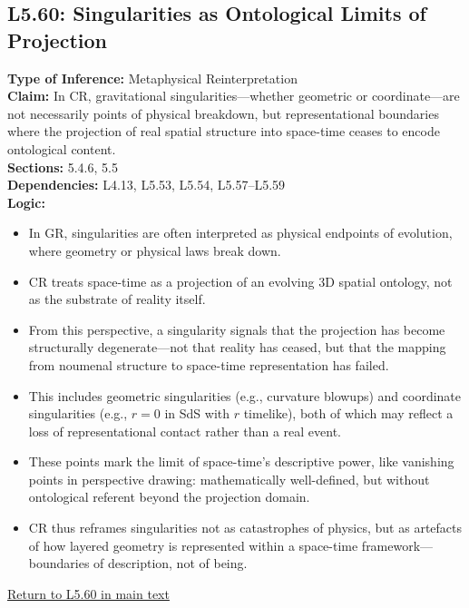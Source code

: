 \documentclass[12pt]{book}
\newcommand{\returnlink}[1]{\hyperref[logic:#1]{Return to #1 in main text}\xspace}
\begin{document}
\subsection*{L5.60: Singularities as Ontological Limits of Projection}
\label{appendix:L5.60}
\textbf{Type of Inference:} Metaphysical Reinterpretation\\
\textbf{Claim:} In CR, gravitational singularities---whether geometric or coordinate---are not necessarily points of physical breakdown, but representational boundaries where the projection of real spatial structure into space-time ceases to encode ontological content.\\
\textbf{Sections:} 5.4.6, 5.5\\
\textbf{Dependencies:} L4.13, L5.53, L5.54, L5.57--L5.59\\
\textbf{Logic:}
\begin{itemize}
  \item In GR, singularities are often interpreted as physical endpoints of evolution, where geometry or physical laws break down.
  \item CR treats space-time as a projection of an evolving 3D spatial ontology, not as the substrate of reality itself.
  \item From this perspective, a singularity signals that the projection has become structurally degenerate---not that reality has ceased, but that the mapping from noumenal structure to space-time representation has failed.
  \item This includes geometric singularities (e.g., curvature blowups) and coordinate singularities (e.g., $r=0$ in SdS with $r$ timelike), both of which may reflect a loss of representational contact rather than a real event.
  \item These points mark the limit of space-time's descriptive power, like vanishing points in perspective drawing: mathematically well-defined, but without ontological referent beyond the projection domain.
  \item CR thus reframes singularities not as catastrophes of physics, but as artefacts of how layered geometry is represented within a space-time framework---boundaries of description, not of being.
\end{itemize}
\returnlink{L5.60}
\end{document}
